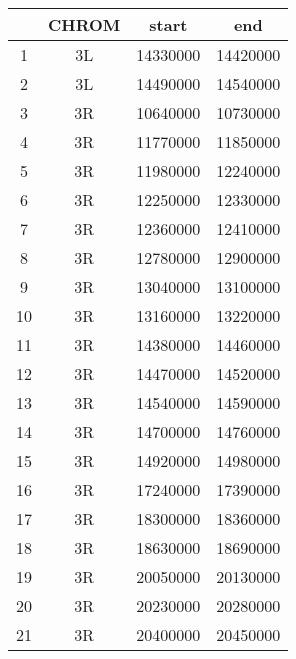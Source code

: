 \centering \begin{tabular}{c|c|c|c}
 	&CHROM	&start	&end\\\hline
1	&3L	&14330000	&14420000\\
2	&3L	&14490000	&14540000\\
3	&3R	&10640000	&10730000\\
4	&3R	&11770000	&11850000\\
5	&3R	&11980000	&12240000\\
6	&3R	&12250000	&12330000\\
7	&3R	&12360000	&12410000\\
8	&3R	&12780000	&12900000\\
9	&3R	&13040000	&13100000\\
10	&3R	&13160000	&13220000\\
11	&3R	&14380000	&14460000\\
12	&3R	&14470000	&14520000\\
13	&3R	&14540000	&14590000\\
14	&3R	&14700000	&14760000\\
15	&3R	&14920000	&14980000\\
16	&3R	&17240000	&17390000\\
17	&3R	&18300000	&18360000\\
18	&3R	&18630000	&18690000\\
19	&3R	&20050000	&20130000\\
20	&3R	&20230000	&20280000\\
21	&3R	&20400000	&20450000\\
\end{tabular}
